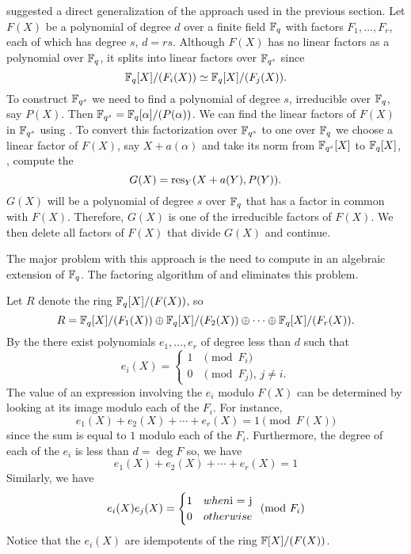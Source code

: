 {\Rabin} suggested a direct generalization of the approach used in the
previous section.  Let $F(X)$ be a polynomial of degree $d$ over a finite 
field $\mathbb{F}_q$ with factors $F_1, \ldots, F_r$, each of which has degree 
$s$, $d = rs$.  Although $F(X)$ has no linear factors as a polynomial over
$\mathbb{F}_q$, it splits into linear factors over $\mathbb{F}_{q^s}$ since 
\[
\mathbb{F}_q[X]/(F_i(X)) \simeq \mathbb{F}_q[X]/(F_j(X)).
\]
To construct $\mathbb{F}_{q^s}$ we need to find a polynomial of degree $s$,
irreducible over $\mathbb{F}_q$, say $P(X)$.  Then $\mathbb{F}_{q^s} =
\mathbb{F}_q[\alpha]/(P(\alpha))$.  We can find the linear factors of $F(X)$
in $\mathbb{F}_{q^s}$ using .  To convert this
factorization over $\mathbb{F}_{q^s}$ to one over $\mathbb{F}_q$ we choose a linear
factor of $F(X)$, say $X + a(\alpha)$ and take its norm
from $\mathbb{F}_{q^s}[X]$ to $\mathbb{F}_q[X]$, \ie, compute the 
\[
G(X) = \mathop{\rm res}\nolimits_Y(X + a(Y), P(Y)).
\]
$G(X)$ will be a polynomial of degree $s$ over $\mathbb{F}_q$ that has a
factor in common with $F(X)$.  Therefore, $G(X)$ is one of the
irreducible factors of $F(X)$.  We then delete all factors of $F(X)$
that divide $G(X)$ and continue.

The major problem with this approach is the need to compute in an
algebraic extension of $\mathbb{F}_q$.  The factoring algorithm of
{\CantorD} and {\Zassenhaus} \cite{Cantor1981-ih} eliminates this problem. 

Let $R$ denote the ring $\mathbb{F}_q[X]/(F(X))$, so
\[
R = \mathbb{F}_q[X]/(F_1(X)) \oplus \mathbb{F}_q[X]/(F_2(X)) \oplus \cdots \oplus
\mathbb{F}_q[X]/(F_r(X)).
\]
By the  there exist polynomials $e_1, \ldots,
e_r$ of degree less than $d$ such that
\begin{equation} \label{Wedd:Basis:Eq}
e_i(X) = 
\begin{cases}
1 & \text{$\pmod{F_i}$} \\
0 & \text{$\pmod{F_j}$, $j\not=i$.}
\end{cases}
\end{equation}
The value of an expression involving the $e_i$ modulo $F(X)$ can be
determined by looking at its image modulo each of the $F_i$.  For
instance, 
\[
e_1(X) + e_2(X) + \cdots + e_r(X) = 1 \pmod{F(X)}
\]
since the sum is equal to $1$ modulo each of the $F_i$.  Furthermore,
the degree of each of the $e_i$ is less than $d = \deg F$ so, we have
\begin{equation} \label{Wedd:Split:Eq}
e_1(X) + e_2(X) + \cdots + e_r(X) = 1
\end{equation}
Similarly, we have
\[
e_i(X) e_j(X) = 
\begin{cases}
1 & when $i = j$ \\
0 & otherwise
\end{cases} \pmod{F_i}
\]
Notice that the $e_i(X)$ are idempotents of the ring $\mathbb{F}[X]/(F(X))$.

